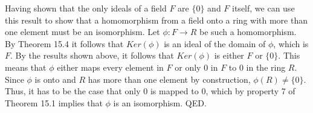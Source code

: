 \documentclass{article}
\theoremstyle{definition}
\begin{document}
Having shown that the only ideals of a field $F$ are $\{0\}$ and $F$ itself, we can use this result to show that a homomorphism from a field onto a ring with more than one element must be an isomorphism. Let $\phi: F \longrightarrow R$ be such a homomorphism. By Theorem 15.4 it follows that $Ker(\phi)$ is an ideal of the domain of $\phi$, which is $F$. By the results shown above, it follows that $Ker(\phi)$ is either $F$ or $\{0\}$. This means that $\phi$ either maps every element in $F$ or only $0$ in $F$ to $0$ in the ring $R$. Since $\phi$ is onto and $R$ has more than one element by construction, $\phi(R) \ne \{0\}$. Thus, it has to be the case that only $0$ is mapped to $0$, which by property 7 of Theorem 15.1 implies that $\phi$ is an isomorphism. QED.\\
\end{document}
